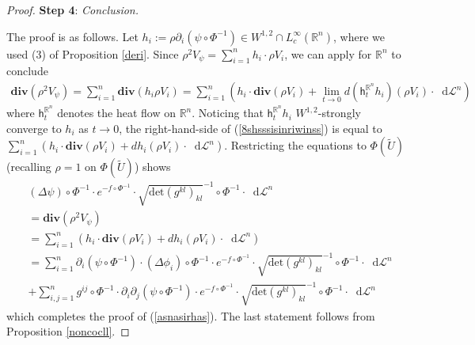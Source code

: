 \documentclass[11pt,reqno]{amsart}
\theoremstyle{definition}
\numberwithin{equation}{section}
\newcommand{\di}{\mathop{}\!\mathrm{d}}
\begin{document}
\begin{proof}
\smallskip

\textbf{Step 4}: \textit{Conclusion.}

\smallskip

The proof is as follows. Let $h_i:=\rho \partial_i(\psi\circ \Phi^{-1}) \in W^{1,2}\cap L^{\infty}_c(\mathbb{R}^n)$, where we used (3) of Proposition \ref{deri}. Since $\rho^2 V_{\psi}=\sum_{i=1}^nh_i \cdot \rho V_i$, we can apply \cite[Theorem 5.3]{BCM} for $\mathbb{R}^n$ to conclude
\begin{align}\label{8shsssisinriwinss}
    \mathbf{div}(\rho^2V_{\psi})=\sum_{i=1}^n\mathbf{div}(h_i\rho V_i)=\sum_{i=1}^n\left(h_i\cdot\mathbf{div}(\rho V_i)+\lim_{t\to 0}d(\mathsf{h}_t^{\mathbb{R}^n}h_i)(\rho V_i)\cdot \di \mathcal{L}^n\right )
\end{align}
where $\mathsf{h}_t^{\mathbb{R}^n}$ denotes the heat flow on $\mathbb{R}^n$. Noticing that $\mathsf{h}_t^{\mathbb{R}^n}h_i$ $W^{1,2}$-strongly converge to $h_i$ as $t \to 0$, the right-hand-side of (\ref{8shsssisinriwinss}) is equal to
$
    \sum_{i=1}^n(h_i\cdot\mathbf{div}(\rho V_i)+dh_i(\rho V_i)\cdot\di \mathcal{L}^n). 
$ 
Restricting the equations to $\Phi(\tilde U)$ (recalling $\rho=1$ on $\Phi(\tilde U)$) shows
\begin{align}
    &(\Delta \psi) \circ \Phi^{-1}\cdot e^{-f\circ \Phi^{-1}}\cdot \sqrt{\mathrm{det}(g^{kl})_{kl}}^{-1}\circ \Phi^{-1}\cdot \di \mathcal{L}^n \nonumber \\
    &=\mathbf{div} (\rho^2 V_{\psi}) \nonumber \\
    &=\sum_{i=1}^n\left(h_i\cdot\mathbf{div}(\rho V_i) +dh_i(\rho V_i)\cdot\di \mathcal{L}^n\right) \nonumber \\
    &=\sum_{i=1}^n\partial_i(\psi \circ \Phi^{-1})\cdot (\Delta \phi_i) \circ \Phi^{-1} \cdot e^{-f\circ \Phi^{-1}}\cdot \sqrt{\mathrm{det}(g^{kl})_{kl}}^{-1}\circ \Phi^{-1}\cdot\di \mathcal{L}^n \nonumber \\
    &+\sum_{i,j=1}^ng^{ij}\circ \Phi^{-1}\cdot \partial_i\partial_j(\psi\circ \Phi^{-1}) \cdot e^{-f\circ \Phi^{-1}}\cdot \sqrt{\mathrm{det}(g^{kl})_{kl}}^{-1}\circ \Phi^{-1}\cdot\di \mathcal{L}^n
\end{align}
which completes the proof of (\ref{asnasirhas}).
The last statement follows from Proposition \ref{noncocll}.
\end{proof}
 
\end{document}
